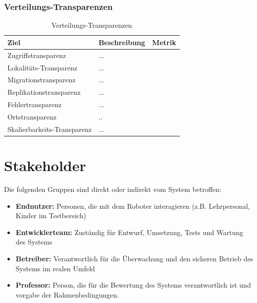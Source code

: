 \subsubsection{Verteilungs-Transparenzen}
    \begin{table}[h!]
            \centering
            \begin{tabular}{p{4cm}|p{5cm}|p{5cm}|}
                \hline
                \textbf{Ziel} & \textbf{Beschreibung} & \textbf{Metrik} \\
                \hline
                Zugriffstransparenz   & ...&\\
                \hline
                Lokalitäts-Transparenz  & ...&\\
                \hline
                Migrationstransparenz & ...&\\
                \hline
                Replikationstransparenz &...&\\
                \hline
                Fehlertransparenz &... &\\
                \hline
                Ortstransparenz & .. &\\
                \hline
                Skalierbarkeits-Transparenz & ... & \\
                \hline
            \end{tabular}
            \caption{Verteilungs-Transparenzen}
            \label{tab:transparenzen}
        \end{table}
        



\clearpage
\section{Stakeholder}
Die folgenden Gruppen sind direkt oder indirekt vom System betroffen:

\begin{itemize}
    \item \textbf{Endnutzer:} Personen, die mit dem Roboter interagieren (z.B. Lehrpersonal, Kinder im Testbereich)
    \item \textbf{Entwicklerteam:} Zuständig für Entwurf, Umsetzung, Tests und Wartung des Systems
    \item \textbf{Betreiber:} Verantwortlich für die Überwachung und den sicheren Betrieb des Systems im realen Umfeld
    \item \textbf{Professor:} Person, die für die Bewertung des Systems verantwortlich ist und vorgabe der Rahmenbedingungen.

\end{itemize}


